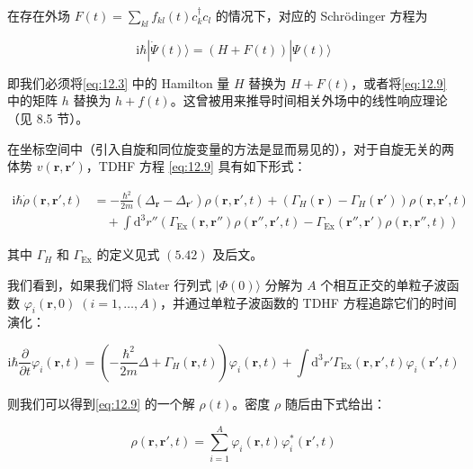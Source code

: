 在存在外场 $F(t)=\sum_{kl}f_{kl}(t)c^{\dagger}_{k}c_{l}$ 的情况下，对应的 Schrödinger
方程为

\begin{equation}
\mathrm{i}\hbar|\dot{\Psi}(t)\rangle=(H+F(t))|\Psi(t)\rangle\label{eq:12.10}
\end{equation}

即我们必须将\ref{eq:12.3} 中的 Hamilton 量 $H$ 替换为 $H+F(t)$，或者将\ref{eq:12.9}
中的矩阵 $h$ 替换为 $h+f(t)$。这曾被用来推导时间相关外场中的线性响应理论（见 8.5 节）。

在坐标空间中（引入自旋和同位旋变量的方法是显而易见的），对于自旋无关的两体势 $v(\boldsymbol{r},\boldsymbol{r}')$，TDHF
方程 \ref{eq:12.9} 具有如下形式：

\begin{align}
\mathrm{i}\hbar\dot{\rho}(\boldsymbol{r},\boldsymbol{r}',t) & =-\frac{\hbar^{2}}{2m}(\Delta_{\boldsymbol{r}}-\Delta_{\boldsymbol{r}'})\rho(\boldsymbol{r},\boldsymbol{r}',t)+(\Gamma_{H}(\boldsymbol{r})-\Gamma_{H}(\boldsymbol{r}'))\rho(\boldsymbol{r},\boldsymbol{r}',t)\nonumber \\
 & \quad+\int\mathrm{d}^{3}r''\left(\Gamma_{\text{Ex}}(\boldsymbol{r},\boldsymbol{r}'')\rho(\boldsymbol{r}'',\boldsymbol{r}',t)-\Gamma_{\text{Ex}}(\boldsymbol{r}'',\boldsymbol{r}')\rho(\boldsymbol{r},\boldsymbol{r}'',t)\right)\label{eq:12.11}
\end{align}

其中 $\Gamma_{H}$ 和 $\Gamma_{\text{Ex}}$ 的定义见式 $(5.42)$ 及后文。

我们看到，如果我们将 Slater 行列式 $|\Phi(0)\rangle$ 分解为 $A$ 个相互正交的单粒子波函数 $\varphi_{i}(\boldsymbol{r},0)\;(i=1,\dots,A)$，并通过单粒子波函数的
TDHF 方程追踪它们的时间演化：

\begin{equation}
\mathrm{i}\hbar\frac{\partial}{\partial t}\varphi_{i}(\boldsymbol{r},t)=\left(-\frac{\hbar^{2}}{2m}\Delta+\Gamma_{H}(\boldsymbol{r},t)\right)\varphi_{i}(\boldsymbol{r},t)+\int\mathrm{d}^{3}r'\Gamma_{\text{Ex}}(\boldsymbol{r},\boldsymbol{r}',t)\varphi_{i}(\boldsymbol{r}',t)\label{eq:12.12}
\end{equation}

则我们可以得到\ref{eq:12.9} 的一个解 $\rho(t)$。密度 $\rho$ 随后由下式给出：

\begin{equation}
\rho(\boldsymbol{r},\boldsymbol{r}',t)=\sum^{A}_{i=1}\varphi_{i}(\boldsymbol{r},t)\varphi^{*}_{i}(\boldsymbol{r}',t)\label{eq:12.13}
\end{equation}

